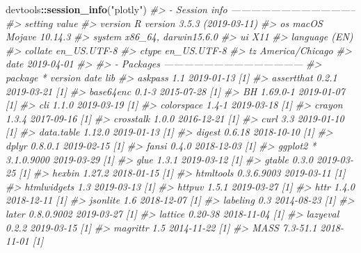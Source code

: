 \documentclass[
  12pt,
]{krantz}
\newenvironment{Shaded}{\begin{snugshade}}{\end{snugshade}}
\newcommand{\CommentTok}[1]{\textcolor[rgb]{0.56,0.35,0.01}{\textit{#1}}}
\newcommand{\KeywordTok}[1]{\textcolor[rgb]{0.13,0.29,0.53}{\textbf{#1}}}
\newcommand{\NormalTok}[1]{#1}
\newcommand{\OperatorTok}[1]{\textcolor[rgb]{0.81,0.36,0.00}{\textbf{#1}}}
\newcommand{\StringTok}[1]{\textcolor[rgb]{0.31,0.60,0.02}{#1}}
\begin{document}
\begin{Shaded}
\begin{Highlighting}[]
\NormalTok{devtools}\OperatorTok{::}\KeywordTok{session_info}\NormalTok{(}\StringTok{"plotly"}\NormalTok{)}
\CommentTok{#> - Session info --------------------------------------}
\CommentTok{#>  setting  value                       }
\CommentTok{#>  version  R version 3.5.3 (2019-03-11)}
\CommentTok{#>  os       macOS Mojave 10.14.3        }
\CommentTok{#>  system   x86_64, darwin15.6.0        }
\CommentTok{#>  ui       X11                         }
\CommentTok{#>  language (EN)                        }
\CommentTok{#>  collate  en_US.UTF-8                 }
\CommentTok{#>  ctype    en_US.UTF-8                 }
\CommentTok{#>  tz       America/Chicago             }
\CommentTok{#>  date     2019-04-01                  }
\CommentTok{#> }
\CommentTok{#> - Packages ------------------------------------------}
\CommentTok{#>  package      * version    date       lib}
\CommentTok{#>  askpass        1.1        2019-01-13 [1]}
\CommentTok{#>  assertthat     0.2.1      2019-03-21 [1]}
\CommentTok{#>  base64enc      0.1-3      2015-07-28 [1]}
\CommentTok{#>  BH             1.69.0-1   2019-01-07 [1]}
\CommentTok{#>  cli            1.1.0      2019-03-19 [1]}
\CommentTok{#>  colorspace     1.4-1      2019-03-18 [1]}
\CommentTok{#>  crayon         1.3.4      2017-09-16 [1]}
\CommentTok{#>  crosstalk      1.0.0      2016-12-21 [1]}
\CommentTok{#>  curl           3.3        2019-01-10 [1]}
\CommentTok{#>  data.table     1.12.0     2019-01-13 [1]}
\CommentTok{#>  digest         0.6.18     2018-10-10 [1]}
\CommentTok{#>  dplyr          0.8.0.1    2019-02-15 [1]}
\CommentTok{#>  fansi          0.4.0      2018-12-03 [1]}
\CommentTok{#>  ggplot2      * 3.1.0.9000 2019-03-29 [1]}
\CommentTok{#>  glue           1.3.1      2019-03-12 [1]}
\CommentTok{#>  gtable         0.3.0      2019-03-25 [1]}
\CommentTok{#>  hexbin         1.27.2     2018-01-15 [1]}
\CommentTok{#>  htmltools      0.3.6.9003 2019-03-11 [1]}
\CommentTok{#>  htmlwidgets    1.3        2019-03-13 [1]}
\CommentTok{#>  httpuv         1.5.1      2019-03-27 [1]}
\CommentTok{#>  httr           1.4.0      2018-12-11 [1]}
\CommentTok{#>  jsonlite       1.6        2018-12-07 [1]}
\CommentTok{#>  labeling       0.3        2014-08-23 [1]}
\CommentTok{#>  later          0.8.0.9002 2019-03-27 [1]}
\CommentTok{#>  lattice        0.20-38    2018-11-04 [1]}
\CommentTok{#>  lazyeval       0.2.2      2019-03-15 [1]}
\CommentTok{#>  magrittr       1.5        2014-11-22 [1]}
\CommentTok{#>  MASS           7.3-51.1   2018-11-01 [1]}

\end{Highlighting}
\end{Shaded}
\end{document}
